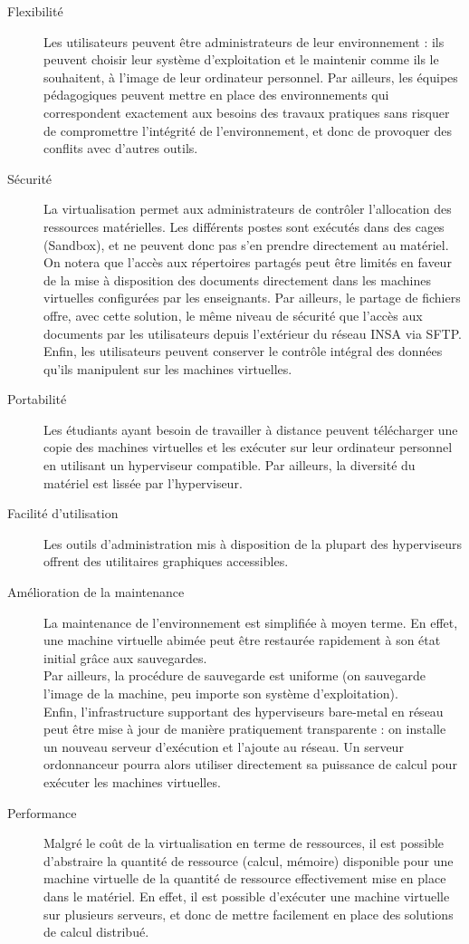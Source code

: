 \begin{description}
  \item[Flexibilité] Les utilisateurs peuvent être administrateurs de leur
  environnement : ils peuvent choisir leur système d'exploitation et le
  maintenir comme ils le souhaitent, à l'image de leur ordinateur personnel.
  Par ailleurs, les équipes pédagogiques peuvent mettre en place des
  environnements qui correspondent exactement aux besoins des travaux pratiques
  sans risquer de compromettre l'intégrité de l'environnement, et donc de
  provoquer des conflits avec d'autres outils.
  \item[Sécurité] La virtualisation permet aux administrateurs de contrôler
  l'allocation des ressources matérielles. Les différents postes sont exécutés
  dans des cages (Sandbox), et ne peuvent donc pas s'en prendre directement au
  matériel.\\
  On notera que l'accès aux répertoires partagés peut être limités en
  faveur de la mise à disposition des documents directement dans les machines
  virtuelles configurées par les enseignants. Par ailleurs, le partage de
  fichiers offre, avec cette solution, le même niveau de sécurité que l'accès
  aux documents par les utilisateurs depuis l'extérieur du réseau INSA via
  SFTP.\\
  Enfin, les utilisateurs peuvent conserver le contrôle intégral des données
  qu'ils manipulent sur les machines virtuelles.
  \item[Portabilité] Les étudiants ayant besoin de travailler à distance
  peuvent télécharger une copie des machines virtuelles et les exécuter sur
  leur ordinateur personnel en utilisant un hyperviseur compatible. Par
  ailleurs, la diversité du matériel est lissée par l'hyperviseur.
  \item[Facilité d'utilisation] Les outils d'administration mis à disposition
  de la plupart des hyperviseurs offrent des utilitaires graphiques accessibles.
  \item[Amélioration de la maintenance] La maintenance de l'environnement est
  simplifiée à moyen terme. En effet, une machine virtuelle abimée peut être
  restaurée rapidement à son état initial grâce aux sauvegardes.\\
  Par ailleurs, la procédure de sauvegarde est uniforme (on sauvegarde l'image
  de la machine, peu importe son système d'exploitation).\\
  Enfin, l'infrastructure supportant des hyperviseurs bare-metal en réseau
  peut être mise à jour de manière pratiquement transparente : on installe un
  nouveau serveur d'exécution et l'ajoute au réseau. Un serveur ordonnanceur
  pourra alors utiliser directement sa puissance de calcul pour exécuter les
  machines virtuelles.
  \item[Performance] Malgré le coût de la virtualisation en terme de
  ressources, il est possible d'abstraire la quantité de ressource
  (calcul, mémoire) disponible pour une machine virtuelle de la quantité de
  ressource effectivement mise en place dans le matériel. En effet, il est
  possible d'exécuter une machine virtuelle sur plusieurs serveurs, et donc de
  mettre facilement en place des solutions de calcul distribué.
\end{description}

